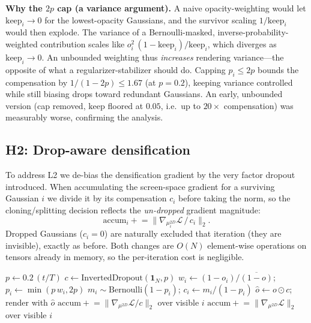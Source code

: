 \documentclass[conference]{IEEEtran}
\begin{document}
\textbf{Why the $2p$ cap (a variance argument).} A naive opacity-weighting would let
$\text{keep}_i\!\to\!0$ for the lowest-opacity Gaussians, and the survivor scaling
$1/\text{keep}_i$ would then explode. The variance of a Bernoulli-masked, inverse-probability-weighted
contribution scales like $o_i^2\,(1-\text{keep}_i)/\text{keep}_i$, which diverges as
$\text{keep}_i\!\to\!0$. An unbounded weighting thus \emph{increases} rendering
variance---the opposite of what a regularizer-stabilizer should do. Capping
$p_i\le 2p$ bounds the compensation by $1/(1-2p)\le 1.67$ (at $p=0.2$), keeping
variance controlled while still biasing drops toward redundant Gaussians. An early,
unbounded version (cap removed, $\text{keep}$ floored at $0.05$, i.e.\ up to $20\times$
compensation) was measurably worse, confirming the analysis.

\subsection{H2: Drop-aware densification}
To address L2 we de-bias the densification gradient by the very factor dropout
introduced. When accumulating the screen-space gradient for a surviving Gaussian $i$ we
divide it by its compensation $c_i$ before taking the norm, so the cloning/splitting
decision reflects the \emph{un-dropped} gradient magnitude:
\begin{equation}
\textstyle \mathrm{accum}_i \mathrel{+}= \big\| \nabla_{\!\mu^{2D}_i}\mathcal{L} \,/\, c_i \big\|_2 .
\end{equation}
Dropped Gaussians ($c_i=0$) are naturally excluded that iteration (they are invisible),
exactly as before. Both changes are $O(N)$ element-wise operations on tensors already in
memory, so the per-iteration cost is negligible.

\begin{algorithm}[t]
\caption{DropGaussian forward + density stats (ours)}
\label{alg:method}
\begin{algorithmic}[1]
\State $p \gets 0.2\,(t/T)$ 
 
  \State $c \gets \mathrm{InvertedDropout}(\mathbf{1}_N, p)$
 
  \State $w_i \gets (1-o_i)/\overline{(1-o)}$;\; $p_i \gets \min(p\,w_i,2p)$
  \State $m_i \sim \mathrm{Bernoulli}(1-p_i)$;\; $c_i \gets m_i/(1-p_i)$
\EndIf
\State $\hat o \gets o \odot c$;\; render with $\hat o$
 
  \State $\mathrm{accum} \mathrel{+}= \|\nabla_{\!\mu^{2D}}\mathcal{L} / c\|_2$ over visible $i$
\Else
  \State $\mathrm{accum} \mathrel{+}= \|\nabla_{\!\mu^{2D}}\mathcal{L}\|_2$ over visible $i$
\EndIf
\end{algorithmic}
\end{algorithm}
\end{document}
